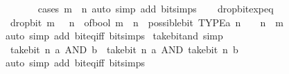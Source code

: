 \begin{isabellebody}
\ \ \ \ \ \ \isamarkupfalse%
\ {\isacharparenleft}{\kern0pt}cases\ {\isacartoucheopen}m\ {\isacharless}{\kern0pt}\ n{\isacartoucheclose}{\isacharparenright}{\kern0pt}\ {\isacharparenleft}{\kern0pt}auto\ simp\ add{\isacharcolon}{\kern0pt}\ bit{\isacharunderscore}{\kern0pt}simps{\isacharparenright}{\kern0pt}\isanewline
\ \ \isamarkupfalse%
\isanewline
{}\isamarkupfalse%
%
\endisatagproof
{\isafoldproof}%
%
\isadelimproof
\isanewline
%
\endisadelimproof
\isanewline
{}\isamarkupfalse%
\ drop{\isacharunderscore}{\kern0pt}bit{\isacharunderscore}{\kern0pt}exp{\isacharunderscore}{\kern0pt}eq{\isacharcolon}{\kern0pt}\isanewline
\ \ {\isacartoucheopen}drop{\isacharunderscore}{\kern0pt}bit\ m\ {\isacharparenleft}{\kern0pt}{}\ {\isacharcircum}{\kern0pt}\ n{\isacharparenright}{\kern0pt}\ {\isacharequal}{\kern0pt}\ of{\isacharunderscore}{\kern0pt}bool\ {\isacharparenleft}{\kern0pt}m\ {\isasymle}\ n\ {\isasymand}\ possible{\isacharunderscore}{\kern0pt}bit\ TYPE{\isacharparenleft}{\kern0pt}{\isacharprime}{\kern0pt}a{\isacharparenright}{\kern0pt}\ n{\isacharparenright}{\kern0pt}\ {\isacharasterisk}{\kern0pt}\ {}\ {\isacharcircum}{\kern0pt}\ {\isacharparenleft}{\kern0pt}n\ {\isacharminus}{\kern0pt}\ m{\isacharparenright}{\kern0pt}{\isacartoucheclose}\isanewline
%
\isadelimproof
\ \ %
\endisadelimproof
%
\isatagproof
{}\isamarkupfalse%
\ {\isacharparenleft}{\kern0pt}auto\ simp\ add{\isacharcolon}{\kern0pt}\ bit{\isacharunderscore}{\kern0pt}eq{\isacharunderscore}{\kern0pt}iff\ bit{\isacharunderscore}{\kern0pt}simps{\isacharparenright}{\kern0pt}%
\endisatagproof
{\isafoldproof}%
%
\isadelimproof
\isanewline
%
\endisadelimproof
\isanewline
{}\isamarkupfalse%
\ take{\isacharunderscore}{\kern0pt}bit{\isacharunderscore}{\kern0pt}and\ {\isacharbrackleft}{\kern0pt}simp{\isacharbrackright}{\kern0pt}{\isacharcolon}{\kern0pt}\isanewline
\ \ {\isacartoucheopen}take{\isacharunderscore}{\kern0pt}bit\ n\ {\isacharparenleft}{\kern0pt}a\ AND\ b{\isacharparenright}{\kern0pt}\ {\isacharequal}{\kern0pt}\ take{\isacharunderscore}{\kern0pt}bit\ n\ a\ AND\ take{\isacharunderscore}{\kern0pt}bit\ n\ b{\isacartoucheclose}\isanewline
%
\isadelimproof
\ \ %
\endisadelimproof
%
\isatagproof
{}\isamarkupfalse%
\ {\isacharparenleft}{\kern0pt}auto\ simp\ add{\isacharcolon}{\kern0pt}\ bit{\isacharunderscore}{\kern0pt}eq{\isacharunderscore}{\kern0pt}iff\ bit{\isacharunderscore}{\kern0pt}simps{\isacharparenright}{\kern0pt}%
\endisatagproof
{\isafoldproof}%
%
\isadelimproof
\isanewline

\end{isabellebody}
